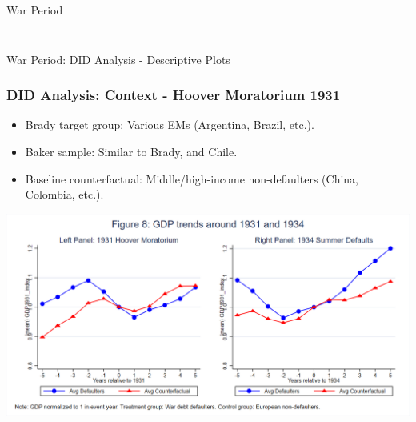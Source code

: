 \documentclass{beamer}
\begin{document}
\begin{frame}{War Period}
\begin{columns}
\begin{column}{0.5\textwidth}
      \label{fig:6_slide}
    \end{column}
  \end{columns}
\end{frame}

\begin{frame}{War Period: DID Analysis - Descriptive Plots}
  \frametitle{DID Analysis: Context - Hoover Moratorium 1931}
  \begin{itemize}
    \item Brady target group: Various EMs (Argentina, Brazil, etc.).
    \item Baker sample: Similar to Brady, and Chile.
    \item Baseline counterfactual: Middle/high-income non-defaulters (China, Colombia, etc.).
  \end{itemize}
  \centering
  \includegraphics[width=0.7\linewidth]{figures/Figure8_GDP_trends_1931_1934.png}
  \label{fig:8_slide}
\end{frame}
\end{document}
